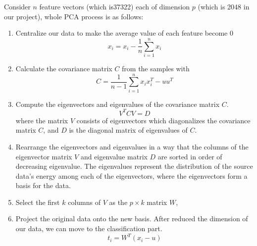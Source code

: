 \documentclass{article}
\begin{document}
    Consider $n$ feature vectors (which is37322) each of dimension $p$ (which is 2048 in our project), whole PCA process is as follows:
\begin{enumerate}
\item Centralize our data to make the average value of each feature become 0
\begin{equation}
	x_i =x_i- \frac{1}{n} \sum_{i=1}^n x_i\label{eq:mean}
\end{equation}

\item Calculate the covariance matrix $C$ from the samples with
\begin{equation}
	C = \frac{1}{n-1} \sum_{i=1}^n x_i x_i^T - u u^T \label{eq:cx}
\end{equation}

\item Compute the eigenvectors and eigenvalues of the covariance matrix $C$.
\begin{equation}
	V^T CV = D \label{eq:eig}
\end{equation}
	where the matrix $V$ consists of eigenvectors which diagonalizes the covariance matrix $C$, and $D$ is the diagonal matrix of eigenvalues of $C$.

\item Rearrange the eigenvectors and eigenvalues in a way that the columns of the eigenvector matrix $V$ and eigenvalue matrix $D$ are sorted in order of decreasing eigenvalue. The eigenvalues represent the distribution of the source data's energy among each of the eigenvectors, where the eigenvectors form a basis for the data.

\item Select the first $k$ columns of $V$ as the $p \times k$ matrix $W$, 

\item Project the original data onto the new basis. After reduced the dimension of our data, we can move to the classification part.
\begin{equation}
	t_i = W^T (x_i - u)\label{eq:proj}
\end{equation}

\end{enumerate}
\end{document}
